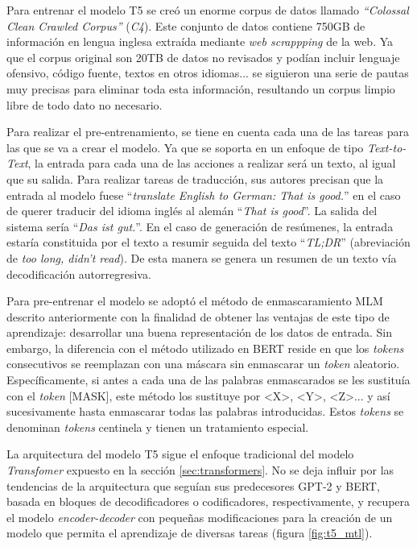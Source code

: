 Para entrenar el modelo T5 se creó un enorme corpus de datos llamado \textit{``Colossal Clean Crawled Corpus''} (\textit{C4}). Este conjunto de datos contiene 750GB de información en lengua inglesa extraída mediante \textit{web scrappping} de la web. Ya que el corpus original son 20TB de datos no revisados y podían incluir lenguaje ofensivo, código fuente, textos en otros idiomas... se siguieron una serie de pautas muy precisas para eliminar toda esta información, resultando un corpus limpio libre de todo dato no necesario.

Para realizar el pre-entrenamiento, se tiene en cuenta cada una de las tareas para las que se va a crear el modelo. Ya que se soporta en un enfoque de tipo \textit{Text-to-Text}, la entrada para cada una de las acciones a realizar será un texto, al igual que su salida. Para realizar tareas de traducción, sus autores precisan que la entrada al modelo fuese ``\textit{translate English to German: That is
	good.}'' en el caso de querer traducir del idioma inglés al alemán ``\textit{That is
	good}''. La salida del sistema sería ``\textit{Das ist gut.}''. En el caso de generación de resúmenes, la entrada estaría constituida por el texto a resumir seguida del texto ``\textit{TL;DR}'' (abreviación de \textit{too long, didn't read}). De esta manera se genera un resumen de un texto vía decodificación autorregresiva. 

Para pre-entrenar el modelo se adoptó el método de enmascaramiento MLM descrito anteriormente con la finalidad de obtener las ventajas de este tipo de aprendizaje: desarrollar una buena representación de los datos de entrada. Sin embargo, la diferencia con el método utilizado en BERT reside en que los \textit{tokens} consecutivos se reemplazan con una máscara sin enmascarar un \textit{token} aleatorio. Específicamente, si antes a cada una de las palabras enmascarados se les sustituía con el \textit{token} [MASK], este método los sustituye por <X>, <Y>, <Z>... y así sucesivamente hasta enmascarar todas las palabras introducidas. Estos \textit{tokens} se denominan \textit{tokens} centinela y tienen un tratamiento especial.


La arquitectura del modelo T5 sigue el enfoque tradicional del modelo \textit{Transfomer} expuesto en la sección \ref{sec:transformers}. No se deja influir por las tendencias de  la arquitectura que seguían sus predecesores GPT-2 y BERT, basada en bloques de decodificadores o codificadores, respectivamente, y recupera el modelo \textit{encoder-decoder} con pequeñas modificaciones para la creación de un modelo que permita el aprendizaje de diversas tareas (figura \ref{fig:t5_mtl}).

